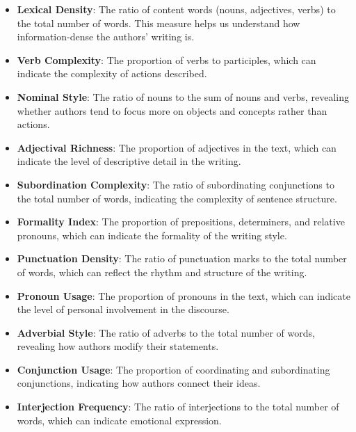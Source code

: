 \documentclass[11pt]{article}
\begin{document}
\begin{itemize}
        \item \textbf{Lexical Density}: The ratio of content words (nouns, adjectives, verbs) to the total number of words. This measure helps us understand how information-dense the authors' writing is.

        \item \textbf{Verb Complexity}: The proportion of verbs to participles, which can indicate the complexity of actions described.

        \item \textbf{Nominal Style}: The ratio of nouns to the sum of nouns and verbs, revealing whether authors tend to focus more on objects and concepts rather than actions.

        \item \textbf{Adjectival Richness}: The proportion of adjectives in the text, which can indicate the level of descriptive detail in the writing.

        \item \textbf{Subordination Complexity}: The ratio of subordinating conjunctions to the total number of words, indicating the complexity of sentence structure.

        \item \textbf{Formality Index}: The proportion of prepositions, determiners, and relative pronouns, which can indicate the formality of the writing style.

        \item \textbf{Punctuation Density}: The ratio of punctuation marks to the total number of words, which can reflect the rhythm and structure of the writing.

        \item \textbf{Pronoun Usage}: The proportion of pronouns in the text, which can indicate the level of personal involvement in the discourse.

        \item \textbf{Adverbial Style}: The ratio of adverbs to the total number of words, revealing how authors modify their statements.

        \item \textbf{Conjunction Usage}: The proportion of coordinating and subordinating conjunctions, indicating how authors connect their ideas.

        \item \textbf{Interjection Frequency}: The ratio of interjections to the total number of words, which can indicate emotional expression.
\end{itemize}
\end{document}
